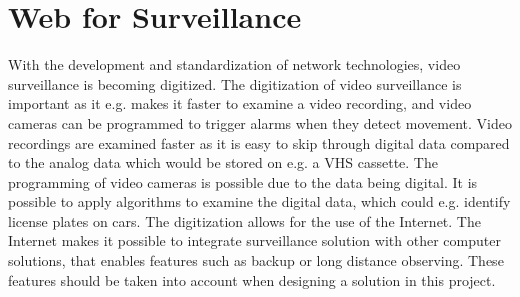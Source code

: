 \section{Web for Surveillance}
With the development and standardization of network technologies, video surveillance is becoming digitized.
The digitization of video surveillance is important as it e.g. makes it faster to examine a video recording, and video cameras can be programmed to trigger alarms when they detect movement.
Video recordings are examined faster as it is easy to skip through digital data compared to the analog data which would be stored on e.g. a VHS cassette.
The programming of video cameras is possible due to the data being digital. 
It is possible to apply algorithms to examine the digital data, which could e.g. identify license plates on cars.
The digitization allows for the use of the Internet.
The Internet makes it possible to integrate surveillance solution with other computer solutions, that enables features such as backup or long distance observing.
These features should be taken into account when designing a solution in this project.
